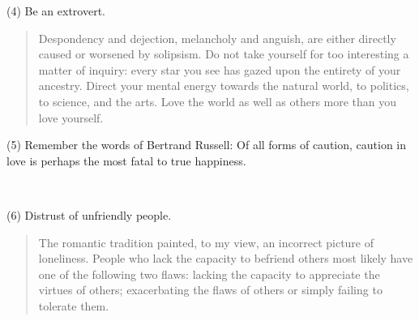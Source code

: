 \documentclass[a4paper, 12pt]{article}
\begin{document}
(4) Be an extrovert.


\small
\begin{quote}

Despondency and dejection, melancholy and anguish, are either directly caused
or worsened by solipsism. Do not take yourself for too interesting a matter of
inquiry: every star you see has gazed upon the entirety of your
ancestry. Direct your mental energy towards the natural world, to politics, to
science, and the arts. Love the world as well as others more than you love
yourself.

\end{quote}
\normalsize

(5) Remember the words of Bertrand Russell: Of all forms of caution, caution in love is perhaps the most fatal to true happiness.

~

(6) Distrust of unfriendly people.


\small
\begin{quote}

The romantic tradition painted, to my view, an incorrect picture of loneliness.
People who lack the capacity to befriend others most likely have one of the
following two flaws: lacking the capacity to appreciate the virtues of others;
exacerbating the flaws of others or simply failing to tolerate them. 


\end{quote}
\normalsize
\end{document}
